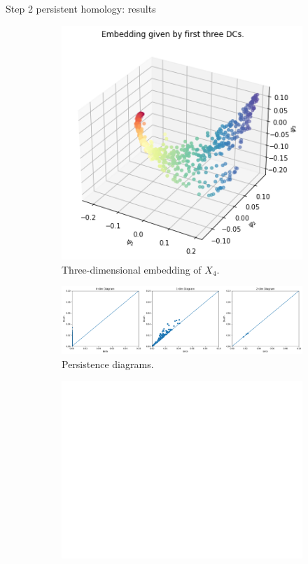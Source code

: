 \documentclass[xcolor={dvipsnames,svgnames}]{beamer}
\begin{document}
\begin{frame}{Step 2 persistent homology: results}
\begin{figure}[H]
\centering
\begin{subfigure}[b]{0.2\textwidth}
    \includegraphics[width=\textwidth]{figures/X4_embedding.png}
    \caption{Three-dimensional embedding of $X_4$.}
\end{subfigure}
\hfill
\begin{subfigure}[b]{0.75\textwidth}
    \includegraphics[width=\textwidth]{figures/X4_H0.png}
    \caption{Persistence diagrams.}
\end{subfigure}
\begin{subfigure}[b]{0.25\textwidth}
\includegraphics[width=\textwidth]{figures/white.png} 

\end{subfigure}
\end{figure}
\end{frame}
\end{document}
